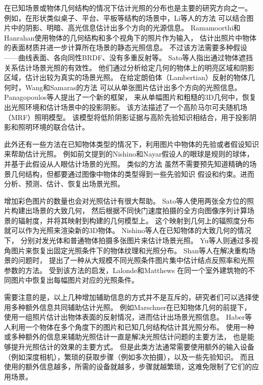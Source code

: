 在已知场景或物体几何结构的情况下估计光照的分布也是主要的研究方向之一。
例如，在形状类似桌子、平台、平板等结构的场景中，Li等人\cite{li2003multiple}的方法
可以结合图片中的阴影、明暗、高光信息估计出多个方向的光源信息。
Ramamoorthi和Hanrahan\cite{ramamoorthi2001signal}使用物体的几何结构和多个视角下的照片作为输入，
估计出照片中物体的表面材质并进一步计算所在场景的静态光照信息。
不过该方法需要多种假设——曲线表面、各向同性BRDF、没有多重反射等。
Sato等人\cite{sato2003illumination}指出通过物体遮挡关系估计场景光照的有效性。
他们通过分析给定几何的物体上的明亮区域和阴影区域，估计出较为真实的场景光照。
在给定朗伯体（Lambertian）反射的物体几何时，Wang和Samaras\cite{wang2002estimation}的方法
可以从单张图片估计出多个方向的光照信息。
Panagopoulos等人\cite{panagopoulos2011illumination}提出了一个新的框架，
来从单幅图片和粗糙的3D几何中，恢复出光照环境和估计场景中的投影阴影。
该方法描述了一个高阶马尔可夫随机场（MRF）照明模型。
该模型将低阶阴影证据与高阶先验知识相结合，用于投影阴影和照明环境的联合估计。

此外还有一些方法在已知物体类型的情况下，利用图片中物体的先验或者假设知识来帮助估计光照。
例如前文提到的Nishino和Nayar\cite{nishino2004eyes}假设人的眼球是规则的球体，
并基于此假设从人眼估计场景的光照。
类似的方法\cite{barron2015shape, lopez2010compositing, rematas2016deep}
虽然不需要预先知道精确的场景几何结构，但都要通过图像中物体的类型得到一些先验知识
假设和约束。进而分析、预测、估计、恢复出场景光照。

增加彩色图片的数量也会对光照估计有很大帮助。
Sato等人\cite{sato1999acquiring}使用两张全方位的照片构建出场景的大致几何，
然后根据不同快门速度拍摄的全方向图像序列计算场景的辐射度，并将其映射到构建的几何模型上。
这个映射到几何上的辐照度分布就可以作为光照来渲染新的3D物体。
Nishino等人\cite{nishino2001determining, nishino2005re}在已知物体的大致几何的情况下，
分别对发光体和普通物体拍摄多张图片来估计场景光照。
Yu等人\cite{yu2006sparse}则通过多视角图片来恢复出固定光照条件下的物体纹理和光照分布。
Shan等人\cite{shan2013visual}在解决重构场景的问题时，
提出了一种从大规模不同光照条件图片集中估计结点反照率和光照参数的方法。
受到该方法的启发，Lalonde和Matthews\cite{lalonde2014lighting}
在同一个室外建筑物的不同图片中恢复出每幅图片对应的光照条件。

需要注意的是，以上几种增加辅助信息的方式并不是互斥的，研究者们可以选择使用多种额外信息共同辅助估计光照。
例如Marschner\cite{marschner1997inverse}在已知物体几何的前提下，
使用一组照片估计出物体表面的反射情况，进而估计出场景光照信息。
Haber等人\cite{haber2009relighting}利用一个物体在多个角度下的图片和已知几何结构估计其光照分布。
使用一种或多种额外的信息来辅助光照估计一直是解决光照估计问题的主要方法，
也是能够提升光照估计的效果的主要方式。
但是此类方法通常需要使用额外的输入设备（例如深度相机），繁琐的获取步骤（例如多次拍摄），以及一些先验知识。
而且使用的额外信息越多，所需的设备就越多，步骤就越繁琐，这难免限制了它们的应用场景。
